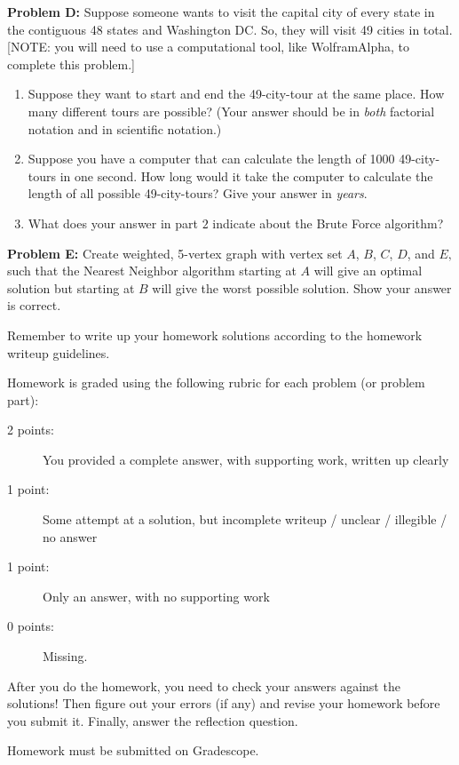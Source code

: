 \documentclass[11pt, oneside]{article}   	%
\begin{document}
\textbf{Problem D:} Suppose someone wants to visit the capital city of every state in the contiguous 48 states and Washington DC. So, they will visit 49 cities in total. [NOTE: you will need to use a computational tool, like WolframAlpha, to complete this problem.]
	\begin{enumerate}
	\item Suppose they want to start and end the 49-city-tour at the same place. How many different tours are possible? (Your answer should be in \emph{both} factorial notation and in scientific notation.)
	\item Suppose you have a computer that can calculate the length of 1000 49-city-tours in one second. How long would it take the computer to calculate the length of all possible 49-city-tours? Give your answer in \emph{years}. 
	\item What does your answer in part $2$ indicate about the Brute Force algorithm?
	\end{enumerate}
\textbf{Problem E:} Create weighted, 5-vertex graph with vertex set $A$, $B$, $C$, $D$, and $E,$ such that the Nearest Neighbor algorithm starting at $A$ will give an optimal solution but starting at $B$ will give the worst possible solution. Show your answer is correct. \\


\hrulefill

Remember to write up your homework solutions according to the homework writeup guidelines. 

Homework is graded using the following rubric for each problem (or problem part):

\begin{description}
\item[2 points:] You provided a complete answer, with supporting work, written up clearly
\item[1 point:] Some attempt at a solution, but incomplete writeup / unclear / illegible / no answer
\item[1 point:] Only an answer, with no supporting work 
\item[0 points:] Missing.
\end{description}

After you do the homework, you need to check your answers against the solutions! Then figure out your errors (if any) and revise your homework before you submit it. Finally, answer the reflection question.

Homework must be submitted on Gradescope.
\end{document}
